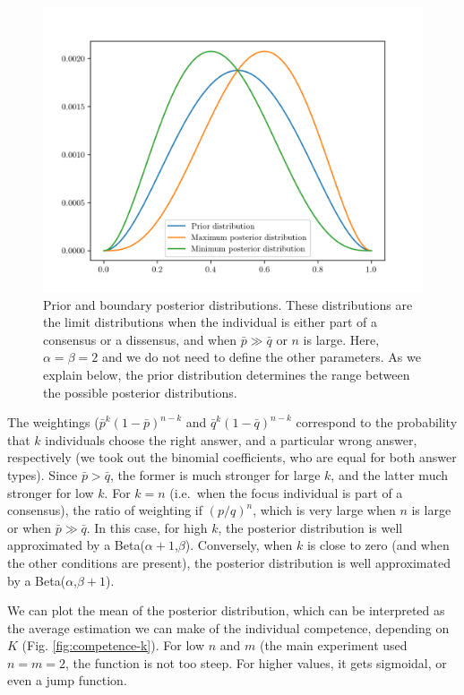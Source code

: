 \documentclass[
  doc,floatsintext]{apa6}
\begin{document}
\begin{figure}

\includegraphics[width=0.75\linewidth]{figures/Benoit_posterior} \hfill{}

\caption{Prior and boundary posterior distributions. These distributions are the limit distributions when the individual is either part of a consensus or a dissensus, and when \(\bar p \gg \bar q\) or \(n\) is large. Here, \(\alpha=\beta=2\) and we do not need to define the other parameters. As we explain below, the prior distribution determines the range between the possible posterior distributions.}\label{fig:posterior}
\end{figure}

The weightings (\(\bar p^k(1-\bar p)^{n-k}\) and \(\bar q^k (1-\bar q)^{n-k}\) correspond to the probability that \(k\) individuals choose the right answer, and a particular wrong answer, respectively (we took out the binomial coefficients, who are equal for both answer types). Since \(\bar p > \bar q\), the former is much stronger for large \(k\), and the latter much stronger for low \(k\). For \(k=n\) (i.e.~when the focus individual is part of a consensus), the ratio of weighting if \((p/q)^n\), which is very large when \(n\) is large or when \(\bar p \gg \bar q\). In this case, for high \(k\), the posterior distribution is well approximated by a Beta(\(\alpha+1\),\(\beta\)). Conversely, when \(k\) is close to zero (and when the other conditions are present), the posterior distribution is well approximated by a Beta(\(\alpha\),\(\beta+1\)).

We can plot the mean of the posterior distribution, which can be interpreted as the average estimation we can make of the individual competence, depending on \(K\) (Fig. \ref{fig:competence-k}). For low \(n\) and \(m\) (the main experiment used \(n=m=2\), the function is not too steep. For higher values, it gets sigmoidal, or even a jump function.
\end{document}

